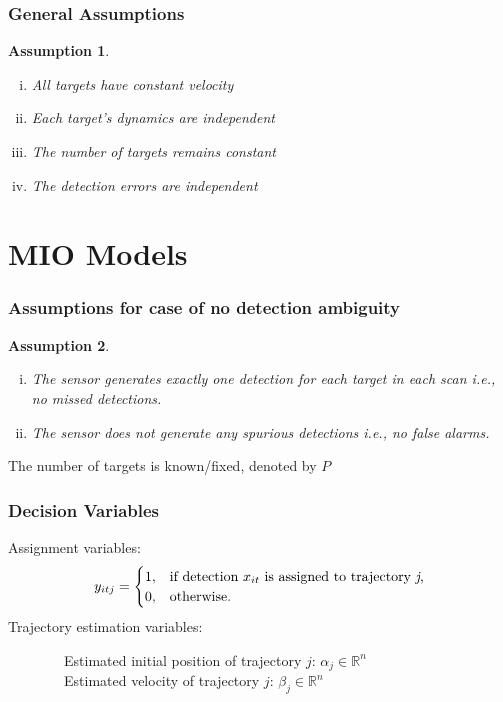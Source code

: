 \documentclass{beamer}
\newtheorem{assumption}{Assumption}
\begin{document}
\begin{frame}
\frametitle{General Assumptions}
\begin{assumption}
\leavevmode
\begin{enumerate}[(i)]
\item All targets have constant velocity
\item Each target's dynamics are independent 
\item The number of targets remains constant 
\item The detection errors are independent
\end{enumerate}
\end{assumption}
\end{frame} 

\section{MIO Models}

\begin{frame}
\frametitle{Assumptions for case of no detection ambiguity}
\begin{assumption}
\leavevmode
\begin{enumerate}[(i)]
\item The sensor generates exactly one detection for each target in each scan i.e., no missed detections.
\item The sensor does not generate any spurious detections
i.e., no false alarms.
\end{enumerate}
\end{assumption}
\begin{corollary}
The number of targets is known/fixed, denoted by $P$
\end{corollary}
\end{frame} 


\begin{frame}
\frametitle{Decision Variables}
Assignment variables:
\newline
\begin{align*}
y_{itj} =
\begin{cases}
1, & \text{if detection $x_{it}$ is assigned to trajectory \textit{j},} \\
0, & \text{otherwise.}
\end{cases}
\end{align*}
\newline
Trajectory estimation variables:
\newline

$\qquad\qquad$Estimated initial position of trajectory $j$: $\alpha_{j} \in \mathbb{R}^n$ \\
$\qquad\qquad$Estimated velocity of trajectory $j$: $\beta_{j} \in \mathbb{R}^n$ 
\end{frame}
\end{document}
